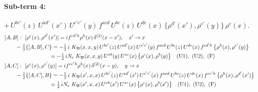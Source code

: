\documentclass[10pt]{article}
\numberwithin{equation}{section}
\begin{document}
\paragraph{Sub-term 4:} $+\,U^{bc'}(z)\,U^{ad'}(x')\,U^{c'e'}(y)\,f^{acd}\,U^{bc}(z)\,U^{de}(x)\,\big\{\rho^{d'}(x'),\rho^{e'}(y)\big\}\,\rho^{e}(x)$.
\begin{align}
&[A,B]:\ [\rho^{e}(x),\rho^{d'}(x')]=i f^{ed'h}\rho^{h}(x)\,\delta^{(2)}(x-x'),\quad x'\to x\notag\\
&\qquad -\tfrac12\{[A,B],C\}=-\tfrac12\,i\,\,K_{\mathfrak B}(x,x,y)\,U^{bc'}(z)\,U^{ad'}(x)\,U^{c'e'}(y)\,f^{acd}\,U^{bc}(z)\,U^{de}(x)\,f^{ed'h}\,\big\{\rho^{h}(x),\rho^{e'}(y)\big\}\notag\\
&\qquad\phantom{-\tfrac12\{[A,B],C\}}=-\tfrac12\,i N_{c}\,\,K_{\mathfrak B}(x,x,y)\,U^{ab}(y)\,U^{ac}(x)\,\big\{\rho^{c}(x),\rho^{b}(y)\big\}\quad\text{(U1)},\ \text{(U2)},\ \text{(F)}
\label{R:eq:GII.I1-4-AB}\\
&[A,C]:\ [\rho^{e}(x),\rho^{e'}(y)]=i f^{ee'h}\rho^{h}(x)\,\delta^{(2)}(x-y),\quad y\to x\notag\\
&\qquad -\tfrac12\{[A,C],B\}=-\tfrac12\,i\,\,K_{\mathfrak B}(x',x,x)\,U^{bc'}(z)\,U^{ad'}(x')\,U^{c'e'}(x)\,f^{acd}\,U^{bc}(z)\,U^{de}(x)\,f^{ee'h}\,\big\{\rho^{h}(x),\rho^{d'}(x')\big\}\notag\\
&\qquad\phantom{-\tfrac12\{[A,C],B\}}=\tfrac12\,i N_{c}\,\,K_{\mathfrak B}(x',x,x)\,U^{ab}(x')\,U^{ac}(x)\,\big\{\rho^{c}(x),\rho^{b}(x')\big\}\quad\text{(U1)},\ \text{(U2)},\ \text{(F)}
\label{R:eq:GII.I1-4-AC}
\end{align}
\end{document}

